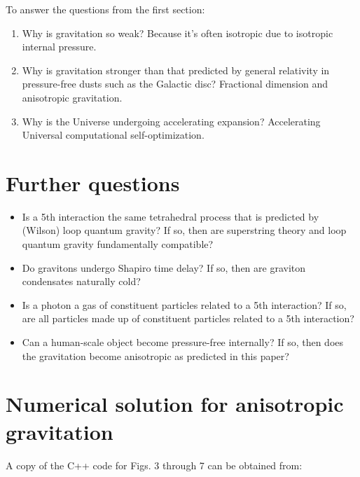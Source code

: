 \documentclass[12pt]{article}
\begin{document}
To answer the questions from the first section:
\begin{enumerate}
\item Why is gravitation so weak? 
Because it's often isotropic due to isotropic internal pressure.
\item Why is gravitation stronger than that predicted by general relativity in pressure-free dusts such as the Galactic disc? 
Fractional dimension and anisotropic gravitation.
\item Why is the Universe undergoing accelerating expansion? 
Accelerating Universal computational self-optimization.
\end{enumerate}









\section{Further questions}
\begin{itemize}
\item Is a 5th interaction the same tetrahedral process that is predicted by (Wilson) loop quantum gravity?
If so, then are superstring theory and loop quantum gravity fundamentally compatible?
\item Do gravitons undergo Shapiro time delay?
If so, then are graviton condensates naturally cold?
\item Is a photon a gas of constituent particles related to a 5th interaction?
If so, are all particles made up of constituent particles related to a 5th interaction?
\item Can a human-scale object become pressure-free internally? 
If so, then does the gravitation become anisotropic as predicted in this paper?
\end{itemize}




\section{Numerical solution for anisotropic gravitation}

A copy of the C++ code for Figs. 3 through 7 can be obtained from:
\end{document}
